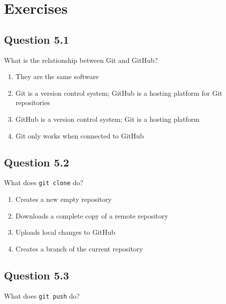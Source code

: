\documentclass[
  letterpaper,
  DIV=11,
  numbers=noendperiod]{scrreprt}
\providecommand{\tightlist}{%
  \setlength{\itemsep}{0pt}\setlength{\parskip}{0pt}}
\begin{document}
\section{Exercises}\label{exercises-4}

\subsection{Question 5.1}\label{question-5.1}

What is the relationship between Git and GitHub?

\begin{enumerate}
\def\labelenumi{\Alph{enumi})}
\tightlist
\item
  They are the same software\\
\item
  Git is a version control system; GitHub is a hosting platform for Git
  repositories\\
\item
  GitHub is a version control system; Git is a hosting platform\\
\item
  Git only works when connected to GitHub
\end{enumerate}

\subsection{Question 5.2}\label{question-5.2}

What does \texttt{git\ clone} do?

\begin{enumerate}
\def\labelenumi{\Alph{enumi})}
\tightlist
\item
  Creates a new empty repository\\
\item
  Downloads a complete copy of a remote repository\\
\item
  Uploads local changes to GitHub\\
\item
  Creates a branch of the current repository
\end{enumerate}

\subsection{Question 5.3}\label{question-5.3}

What does \texttt{git\ push} do?
\end{document}
